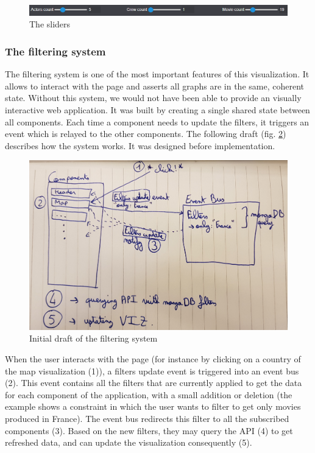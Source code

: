 \documentclass[a4paper,10pt]{article}
\begin{document}
\begin{figure}[ht]
   \centering
   \includegraphics[width=0.6\linewidth]{images/screens/network-movies-sliders.png}
  \caption{The sliders} \label{fig:screen-network-movies-sliders}
\end{figure}


\subsubsection{The filtering system} \label{sec:filtering-system}

The filtering system is one of the most important features of this visualization.
It allows to interact with the page and asserts all graphs are in the same, coherent
state. Without this system, we would not have been able to provide an visually interactive web application.
It was built by creating a single shared state between all components. Each
time a component needs to update the filters, it triggers an event which is relayed
to the other components. The following draft (fig. \ref{fig:draft-filtering}) describes how the system works. It
was designed before implementation.

\begin{figure}[ht]
   \centering
   \includegraphics[width=0.6\linewidth]{images/drafts/filtering-system.jpg}
  \caption{Initial draft of the filtering system} \label{fig:draft-filtering}
\end{figure}

When the user interacts with the page (for instance by clicking on a country of the
map visualization (1)), a filters update event is triggered into an event bus (2). This
event contains all the filters that are currently applied to get the data for each
component of the application, with a small addition or deletion (the example shows
a constraint in which the user wants to filter to get only movies produced in France).
The event bus redirects this filter to all the subscribed components (3). Based on
the new filters, they may query the API (4) to get refreshed data, and can update
the visualization consequently (5).
\end{document}

